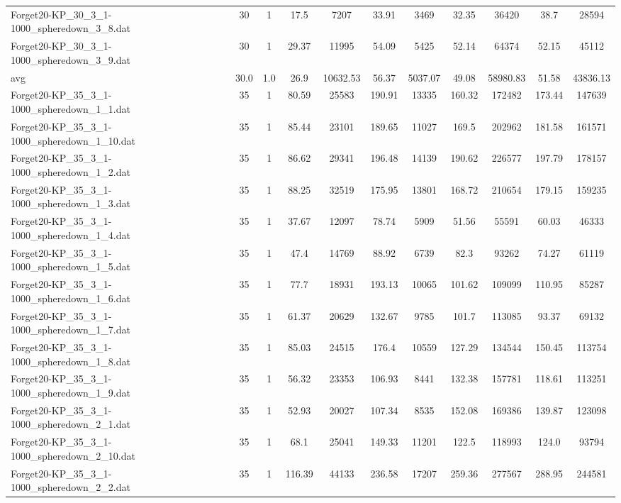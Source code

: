 \begin{table}[!ht]
\begin{tabular}{lcccccccccc}
Forget20-KP\_30\_3\_1-1000\_spheredown\_3\_8.dat & 30 & 1 & 17.5 & 7207 & 33.91 & 3469 & 32.35 & 36420 & 38.7 & 28594 \\
Forget20-KP\_30\_3\_1-1000\_spheredown\_3\_9.dat & 30 & 1 & 29.37 & 11995 & 54.09 & 5425 & 52.14 & 64374 & 52.15 & 45112 \\
\hline avg & 30.0 & 1.0 & 26.9& 10632.53 & 56.37& 5037.07 & 49.08& 58980.83 & 51.58& 43836.13\\ \hline
Forget20-KP\_35\_3\_1-1000\_spheredown\_1\_1.dat & 35 & 1 & 80.59 & 25583 & 190.91 & 13335 & 160.32 & 172482 & 173.44 & 147639 \\
Forget20-KP\_35\_3\_1-1000\_spheredown\_1\_10.dat & 35 & 1 & 85.44 & 23101 & 189.65 & 11027 & 169.5 & 202962 & 181.58 & 161571 \\
Forget20-KP\_35\_3\_1-1000\_spheredown\_1\_2.dat & 35 & 1 & 86.62 & 29341 & 196.48 & 14139 & 190.62 & 226577 & 197.79 & 178157 \\
Forget20-KP\_35\_3\_1-1000\_spheredown\_1\_3.dat & 35 & 1 & 88.25 & 32519 & 175.95 & 13801 & 168.72 & 210654 & 179.15 & 159235 \\
Forget20-KP\_35\_3\_1-1000\_spheredown\_1\_4.dat & 35 & 1 & 37.67 & 12097 & 78.74 & 5909 & 51.56 & 55591 & 60.03 & 46333 \\
Forget20-KP\_35\_3\_1-1000\_spheredown\_1\_5.dat & 35 & 1 & 47.4 & 14769 & 88.92 & 6739 & 82.3 & 93262 & 74.27 & 61119 \\
Forget20-KP\_35\_3\_1-1000\_spheredown\_1\_6.dat & 35 & 1 & 77.7 & 18931 & 193.13 & 10065 & 101.62 & 109099 & 110.95 & 85287 \\
Forget20-KP\_35\_3\_1-1000\_spheredown\_1\_7.dat & 35 & 1 & 61.37 & 20629 & 132.67 & 9785 & 101.7 & 113085 & 93.37 & 69132 \\
Forget20-KP\_35\_3\_1-1000\_spheredown\_1\_8.dat & 35 & 1 & 85.03 & 24515 & 176.4 & 10559 & 127.29 & 134544 & 150.45 & 113754 \\
Forget20-KP\_35\_3\_1-1000\_spheredown\_1\_9.dat & 35 & 1 & 56.32 & 23353 & 106.93 & 8441 & 132.38 & 157781 & 118.61 & 113251 \\
Forget20-KP\_35\_3\_1-1000\_spheredown\_2\_1.dat & 35 & 1 & 52.93 & 20027 & 107.34 & 8535 & 152.08 & 169386 & 139.87 & 123098 \\
Forget20-KP\_35\_3\_1-1000\_spheredown\_2\_10.dat & 35 & 1 & 68.1 & 25041 & 149.33 & 11201 & 122.5 & 118993 & 124.0 & 93794 \\
Forget20-KP\_35\_3\_1-1000\_spheredown\_2\_2.dat & 35 & 1 & 116.39 & 44133 & 236.58 & 17207 & 259.36 & 277567 & 288.95 & 244581 \\

\end{tabular}
\end{table}
